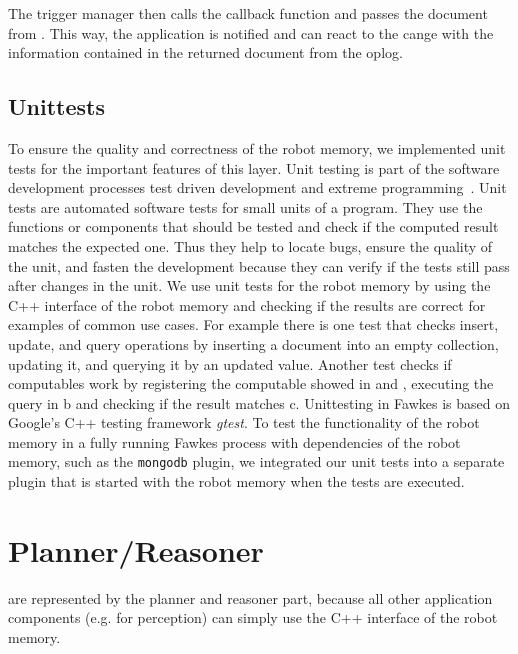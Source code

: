 The trigger manager then calls the callback function and passes the
document from . This way, the application is
notified and can react to the cange with the information contained in
the returned document from the oplog.

\subsection{Unittests}
\label{sec:impl-unittests}
To ensure the quality and correctness of the robot memory, we
implemented unit tests for the important features of this layer. Unit
testing is part of the software development processes test driven
development and extreme programming~\cite{beck-test,beck-xp}. Unit
tests are automated software tests for small units of a program. They
use the functions or components that should be tested and check if the
computed result matches the expected one. Thus they help to locate
bugs, ensure the quality of the unit, and fasten the development
because they can verify if the tests still pass after changes in the
unit. We use unit tests for the robot memory by using the C++
interface of the robot memory and checking if the results are correct
for examples of common use cases. For example there is one test that
checks insert, update, and query operations by inserting a document
into an empty collection, updating it, and querying it by an updated
value. Another test checks if computables work by registering the
computable showed in  and ,
executing the query in b and checking if the result
matches c. Unittesting in Fawkes is based on Google's
C++ testing framework \emph{gtest}. To test the functionality of the
robot memory in a fully running Fawkes process with dependencies of
the robot memory, such as the \texttt{mongodb} plugin, we integrated
our unit tests into a separate plugin that is started with the robot
memory when the tests are executed.

\section{Planner/Reasoner}
\label{sec:impl-planner}
are represented by the planner and reasoner part, because all
other application components (e.g. for perception) can simply use the
C++ interface of the robot memory.



